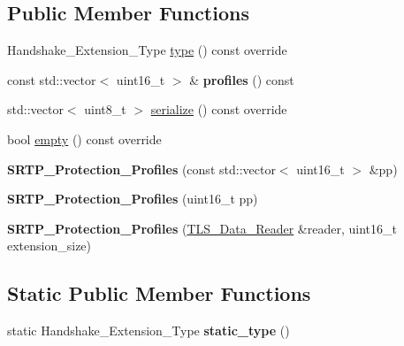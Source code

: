 \subsection*{Public Member Functions}
\begin{DoxyCompactItemize}
\item 
Handshake\+\_\+\+Extension\+\_\+\+Type \mbox{\hyperlink{class_botan_1_1_t_l_s_1_1_s_r_t_p___protection___profiles_a7d0e938631996e86ceab9f94092f9119}{type}} () const override
\item 
\mbox{\label{class_botan_1_1_t_l_s_1_1_s_r_t_p___protection___profiles_a333448e154b78ae1e51ffb48772f373d}} 
const std\+::vector$<$ uint16\+\_\+t $>$ \& {\bfseries profiles} () const
\item 
std\+::vector$<$ uint8\+\_\+t $>$ \mbox{\hyperlink{class_botan_1_1_t_l_s_1_1_s_r_t_p___protection___profiles_afee35a4c6428af5684932384dc8bb3c3}{serialize}} () const override
\item 
bool \mbox{\hyperlink{class_botan_1_1_t_l_s_1_1_s_r_t_p___protection___profiles_a4b6f1e03445601ca122e036c03e1dcbb}{empty}} () const override
\item 
\mbox{\label{class_botan_1_1_t_l_s_1_1_s_r_t_p___protection___profiles_a5a10843ddeb7cdeea9fbf5284a1a7878}} 
{\bfseries S\+R\+T\+P\+\_\+\+Protection\+\_\+\+Profiles} (const std\+::vector$<$ uint16\+\_\+t $>$ \&pp)
\item 
\mbox{\label{class_botan_1_1_t_l_s_1_1_s_r_t_p___protection___profiles_a15f337b05fa101665e4241c4662ba9ca}} 
{\bfseries S\+R\+T\+P\+\_\+\+Protection\+\_\+\+Profiles} (uint16\+\_\+t pp)
\item 
\mbox{\label{class_botan_1_1_t_l_s_1_1_s_r_t_p___protection___profiles_a2eeedb34d89e8d0c142b57d30f440a3c}} 
{\bfseries S\+R\+T\+P\+\_\+\+Protection\+\_\+\+Profiles} (\mbox{\hyperlink{class_botan_1_1_t_l_s_1_1_t_l_s___data___reader}{T\+L\+S\+\_\+\+Data\+\_\+\+Reader}} \&reader, uint16\+\_\+t extension\+\_\+size)
\end{DoxyCompactItemize}
\subsection*{Static Public Member Functions}
\begin{DoxyCompactItemize}
\item 
\mbox{\label{class_botan_1_1_t_l_s_1_1_s_r_t_p___protection___profiles_ac66d235f88a4f064b64893ea573a50b8}} 
static Handshake\+\_\+\+Extension\+\_\+\+Type {\bfseries static\+\_\+type} ()
\end{DoxyCompactItemize}


